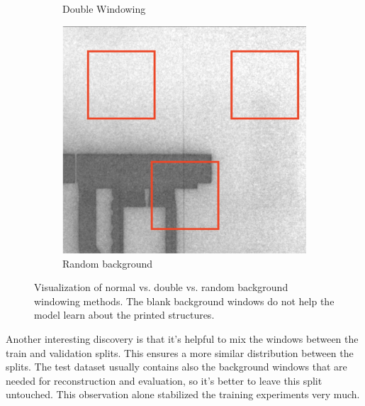 \begin{figure}[!h]
\begin{subfigure}{0.33\textwidth}
   \caption{Double Windowing}
 \end{subfigure}%
 \begin{subfigure}{0.33\textwidth}
   \centering
   \includegraphics[width=\linewidth]{images/implementation/windowing/bckg_window}
   \caption{Random background}
 \end{subfigure}
 \caption{Visualization of normal vs. double vs. random background windowing methods. The blank background windows do not help the model learn about the printed structures.}
 \label{impl:normal_vs_double_bck_win}
 \end{figure}

Another interesting discovery is that it's helpful to mix the windows between the train and validation splits. This ensures a more similar distribution between the splits. The test dataset usually contains also the background windows that are needed for reconstruction and evaluation, so it's better to leave this split untouched. This observation alone stabilized the training experiments very much.  \\

